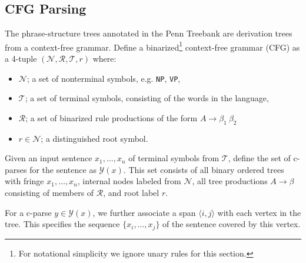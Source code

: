 \documentclass[11pt,letterpaper]{article}
\newcommand{\nonterms}{\mathcal{N}}
\newcommand{\rules}{\mathcal{R}}
\newcommand{\terms}{\mathcal{T}}
\newcommand{\Span}[1]{\langle #1 \rangle}
\newcommand{\Tag}[1]{\texttt{#1}}
\newcommand{\Root}{r}
\newcommand{\Rule}[3]{#1 \rightarrow #2\ #3}
\newcommand{\RuleA}[3]{#1 \rightarrow #2^*\ #3}
\newcommand{\RuleB}[3]{#1 \rightarrow #2\ #3^*}
\begin{document}

\subsection{CFG Parsing}

The phrase-structure trees annotated in the Penn Treebank are derivation trees from a context-free grammar. 
Define a binarized\footnote{For notational simplicity we ignore unary rules for this section.} context-free grammar (CFG) as a 4-tuple $(\nonterms, \rules, \terms, \Root)$ where:
\begin{itemize}
\item $\nonterms$; a set of nonterminal symbols, e.g. \Tag{NP},
  \Tag{VP}, 
\item $\terms$; a set of terminal symbols, consisting of the
  words in the language, 
\item $\rules$; a set of binarized rule productions
  of the form $\Rule{A}{\beta_1}{\beta_2}$ 
\item $\Root \in \nonterms$; a distinguished root symbol.
\end{itemize}


Given an input sentence $x_1, \ldots, x_n$ of terminal symbols from
$\terms$, define the set of c-parses for the sentence as
$\mathcal{Y}(x)$. This set consists of all binary ordered trees with
fringe $x_1, \ldots, x_n$, internal nodes labeled from $\nonterms$,
all tree productions $A \rightarrow \beta$ consisting of members of
$\rules$, and root label $\Root$.

For a c-parse $y \in \mathcal{Y}(x)$,
we further associate a span $\Span{i, j}$ with each vertex in the tree. This specifies the 
sequence $\{x_i, \ldots, x_j\}$ of the sentence covered by this vertex.


\end{document}
